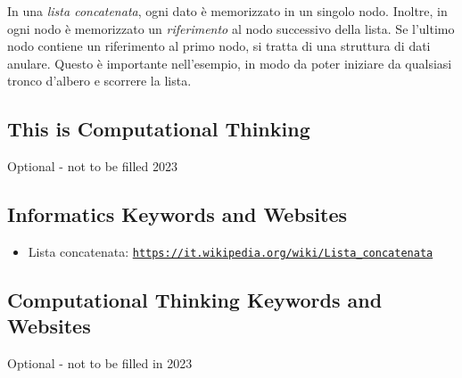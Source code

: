 \documentclass[a4paper,11pt]{report}
\newcommand{\BrochureUrlText}[1]{\texttt{#1}}
\begin{document}
In una \emph{lista concatenata}, ogni dato è memorizzato in un singolo nodo. Inoltre, in ogni nodo è memorizzato un \emph{riferimento} al nodo successivo della lista. Se l’ultimo nodo contiene un riferimento al primo nodo, si tratta di una struttura di dati anulare. Questo è importante nell’esempio, in modo da poter iniziare da qualsiasi tronco d’albero e scorrere la lista.


\subsection*{This is Computational Thinking}

Optional - not to be filled 2023


\subsection*{Informatics Keywords and Websites}

\begin{itemize}
  \item Lista concatenata: \href{https://it.wikipedia.org/wiki/Lista_concatenata}{\BrochureUrlText{https://it.wikipedia.org/wiki/Lista\_concatenata}}
\end{itemize}


\subsection*{Computational Thinking Keywords and Websites}

Optional - not to be filled in 2023
\end{document}
